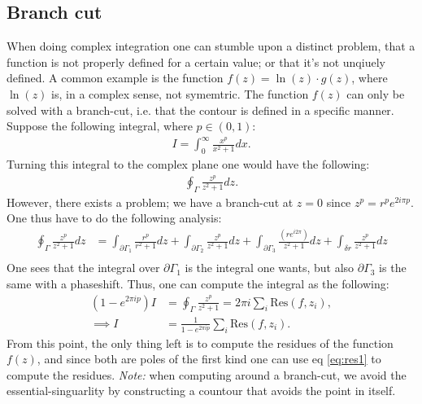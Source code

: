 \documentclass[12pt]{article}
\newcommand{\res}[2]{\text{Res}(#1,#2)}
\newcommand{\note}{\textit{Note: }}
\begin{document}
\subsection{Branch cut}
When doing complex integration one can stumble upon a distinct problem, that a function is not properly defined for a certain value; or that it's not unqiuely defined. A common example is the function $f(z) = \ln(z)\cdot g(z)$, where $\ln(z)$ is, in a complex sense, not symemtric. The function $f(z)$ can only be solved with a branch-cut, i.e. that the contour is defined in a specific manner. Suppose the following integral, where $p\in(0,1)$:
\begin{align*}
    I = \int_0^\infty \frac{x^p}{x^2 + 1}dx.
\end{align*}Turning this integral to the complex plane one would have the following:
\begin{align*}
    \oint_\Gamma \frac{z^p}{z^2 + 1}dz.
\end{align*}However, there exists a problem; we have a branch-cut at $z = 0$ since $z^p = r^p e^{2i\pi p}$. One thus have to do the following analysis:
\begin{align*}
    \oint_\Gamma \frac{z^p}{z^2 + 1}dz &= \int_{\partial\Gamma_1} \frac{r^p}{r^2 + 1}dz + \int_{\partial\Gamma_2} \frac{z^p}{z^2 + 1}dz + \int_{\partial \Gamma_3} \frac{(re^{i2\pi})}{z^2 + 1}dz + \int_{\delta r}\frac{z^p}{z^2 + 1}dz\\
\end{align*}One sees that the integral over $\partial \Gamma_1$ is the integral one wants, but also $\partial\Gamma_3$ is the same with a phaseshift. Thus, one can compute the integral as the following:
\begin{align*}
    (1-e^{2\pi i p})I &= \oint_{\Gamma}\frac{z^p}{z^2 + 1} = 2\pi i\sum_{i}\res{f}{z_i},\\
    \implies I &= \frac{1}{1-  e^{2\pi ip}}\sum_{i}\res{f}{z_i}.
\end{align*}From this point, the only thing left is to compute the residues of the function $f(z)$, and since both are poles of the first kind one can use eq \eqref{eq:res1} to compute the residues.
\note when computing around a branch-cut, we avoid the essential-singuarlity by constructing a countour that avoids the point in itself.
\end{document}
